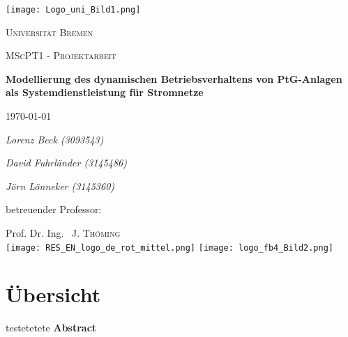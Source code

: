 \documentclass[onecolumn,10pt,titlepage]{article}
\begin{document}
\begin{titlepage}
	\centering
	
	{\texttt{[image: Logo\_uni\_Bild1.png]}\par}
	\vspace{1cm}
	{\scshape\Large Universität Bremen \par}
	\vspace{1cm}
	{\scshape\LARGE MScPT1 - Projektarbeit \par}
	\vspace{1.5cm}
	{\huge\bfseries Modellierung des dynamischen Betriebsverhaltens von PtG-Anlagen als Systemdienstleistung für Stromnetze\par}
	\vspace{2cm}
    {\large \today\par}
    \vspace{2cm}
	{\Large\itshape Lorenz Beck (3093543)\par}
    \vspace{0.3cm}
    {\Large\itshape David Fuhrländer (3145486)\par}
    \vspace{0.3cm}
    {\Large\itshape Jörn Lönneker (3145360)\par}
	\vfill
	betreuender Professor:\par
	Prof. Dr. Ing. ~J. \textsc{Thöming}\\

    \vfill
   	\texttt{[image: RES\_EN\_logo\_de\_rot\_mittel.png]}
	\hfill	
	\texttt{[image: logo\_fb4\_Bild2.png]}%

	
\end{titlepage}

\onehalfspace

\section*{Übersicht}
testetetete
{\textbf{Abstract}}\par
\end{document}
